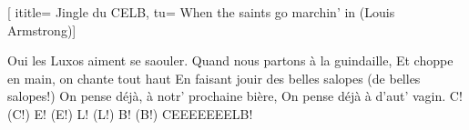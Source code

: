  [
ititle= {Jingle du CELB},
tu= {When the saints go marchin' in (Louis Armstrong)}]

\beginverse
{}
Oui les Luxos aiment se saouler.
Quand nous partons à la guindaille,
Et choppe en main, on chante tout haut
En faisant jouir des belles salopes (de belles salopes!)
On pense déjà, à notr' prochaine bière,
On pense déjà à d'aut' vagin.
C! (C!) E! (E!) L! (L!) B! (B!)
CEEEEEEELB!
\endverse

\endsong